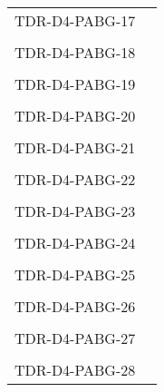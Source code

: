 \begin{longtable}{|p{2cm}|p{12cm}|@{}}
\\
\hline  
TDR-D4-PABG-17&
\begin{minipage}{12cm}
\end{minipage}\\
\\
\hline                                    
TDR-D4-PABG-18&
\begin{minipage}{12cm}
\end{minipage}\\
\\
\hline  
TDR-D4-PABG-19&
\begin{minipage}{12cm}
\end{minipage}\\
\\
\hline  
TDR-D4-PABG-20&
\begin{minipage}{12cm}
\end{minipage}\\
\\
\hline  
TDR-D4-PABG-21&
\begin{minipage}{12cm}
\end{minipage}\\
\\
\hline  
TDR-D4-PABG-22&
\begin{minipage}{12cm}
\end{minipage}\\
\\
\hline  
TDR-D4-PABG-23&
\begin{minipage}{12cm}
\end{minipage}\\
\\
\hline  
TDR-D4-PABG-24&
\begin{minipage}{12cm}
\end{minipage}\\
\\
\hline  
TDR-D4-PABG-25&
\begin{minipage}{12cm}
\end{minipage}\\
\\
\hline  
TDR-D4-PABG-26&
\begin{minipage}{12cm}
\end{minipage}\\
\\
\hline  
TDR-D4-PABG-27&
\begin{minipage}{12cm}
\end{minipage}\\
\\
\hline 
TDR-D4-PABG-28&

\end{longtable}
